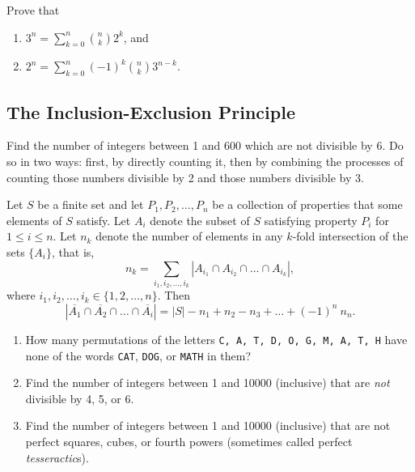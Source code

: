 \begin{exercise} Prove that
    \begin{enumerate}
        \item $\displaystyle 3^n = \sum_{k=0}^n {{n}\choose{k}} 2^k$, and
        \item $\displaystyle 2^n = \sum_{k=0}^n (-1)^k {{n}\choose{k}} 3^{n-k}$.
    \end{enumerate}
\end{exercise}

\subsection{The Inclusion-Exclusion Principle}

\begin{exercise} Find the number of integers between 1 and 600 which are not divisible by 6.  Do so in two ways: first, by directly counting it, then by combining the processes of counting those numbers divisible by 2 and those numbers divisible by 3.
\end{exercise}

\begin{theorem} Let $S$ be a finite set and let $P_1, P_2, \ldots, P_n$ be a collection of properties that some elements of $S$ satisfy.  Let $A_i$ denote the subset of $S$ satisfying property $P_i$ for $1\leq i \leq n$.  Let $n_k$ denote the number of elements in any $k$-fold intersection of the sets $\{A_i\}$, that is,
$$n_k = \displaystyle \sum_{i_1, i_2, \ldots, i_k} |A_{i_1} \cap A_{i_2} \cap \ldots \cap A_{i_k}|,$$
where $i_1, i_2, \ldots, i_k \in \{1, 2, \ldots, n\}$.  Then
$$|\overline{A_1}\cap \overline{A_2}\cap \ldots \cap \overline{A_i} |= |S| - n_1 + n_2 - n_3 + \ldots + (-1)^n\ n_n.$$
\end{theorem}

\begin{examples}\leavevmode
\begin{enumerate}
    \item How many permutations of the letters \texttt{C, A, T, D, O, G, M, A, T, H} have none of the words \texttt{CAT}, \texttt{DOG}, or \texttt{MATH} in them?
    \item Find the number of integers between 1 and 10000 (inclusive) that are \textit{not} divisible by 4, 5, or 6.
    \item Find the number of integers between 1 and 10000 (inclusive) that are not perfect squares, cubes, or fourth powers (sometimes called perfect \textit{tesseractic}s).
\end{enumerate}
\end{examples}

